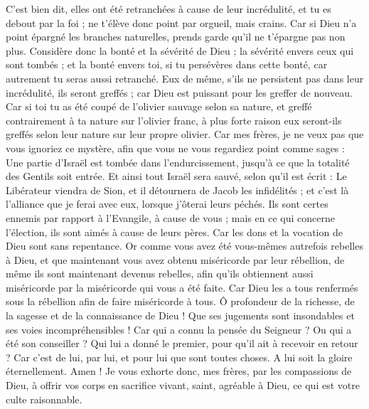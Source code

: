\begin{multicols}{2}
C'est bien dit, elles ont été retranchées à cause de leur incrédulité, et tu es debout par la foi ; ne t'élève donc point par orgueil, mais crains.
Car si Dieu n'a point épargné les branches naturelles, prends garde qu'il ne t'épargne pas non plus.
Considère donc la bonté et la sévérité de Dieu ; la sévérité envers ceux qui sont tombés ; et la bonté envers toi, si tu persévères dans cette bonté, car autrement tu seras aussi retranché.
Eux de même, s'ils ne persistent pas dans leur incrédulité, ils seront greffés ; car Dieu est puissant pour les greffer de nouveau.
Car si toi tu as été coupé de l'olivier sauvage selon sa nature, et greffé contrairement à ta nature sur l'olivier franc, à plus forte raison eux seront-ils greffés selon leur nature sur leur propre olivier.
Car mes frères, je ne veux pas que vous ignoriez ce mystère, afin que vous ne vous regardiez point comme sages : Une partie d'Israël est tombée dans l'endurcissement, jusqu'à ce que la totalité des Gentils soit entrée.
Et ainsi tout Israël sera sauvé, selon qu'il est écrit : Le Libérateur viendra de Sion, et il détournera de Jacob les infidélités ;
et c'est là l'alliance que je ferai avec eux, lorsque j'ôterai leurs péchés.
Ils sont certes ennemis par rapport à l'Evangile, à cause de vous ; mais en ce qui concerne l'élection, ils sont aimés à cause de leurs pères.
Car les dons et la vocation de Dieu sont sans repentance.
Or comme vous avez été vous-mêmes autrefois rebelles à Dieu, et que maintenant vous avez obtenu miséricorde par leur rébellion,
de même ils sont maintenant devenus rebelles, afin qu'ils obtiennent aussi miséricorde par la miséricorde qui vous a été faite.
Car Dieu les a tous renfermés sous la rébellion afin de faire miséricorde à tous.
Ô profondeur de la richesse, de la sagesse et de la connaissance de Dieu ! Que ses jugements sont insondables et ses voies incompréhensibles !
Car qui a connu la pensée du Seigneur ? Ou qui a été son conseiller ?
Qui lui a donné le premier, pour qu'il ait à recevoir en retour ?
Car c'est de lui, par lui, et pour lui que sont toutes choses. A lui soit la gloire éternellement. Amen !
\VerseOne{}Je vous exhorte donc, mes frères, par les compassions de Dieu, à offrir vos corps en sacrifice vivant, saint, agréable à Dieu, ce qui est votre culte raisonnable.

\end{multicols}
